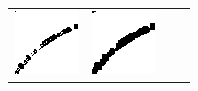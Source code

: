 \documentclass[preprint]{iucr}              %
\begin{document}
\begin{figure}
\begin{tabular}{>{\centering\arraybackslash}m{.1\linewidth}>{\centering\arraybackslash}m{.25\linewidth}>{\centering\arraybackslash}m{.25\linewidth}>{\centering\arraybackslash}m{.25\linewidth}}
\includegraphics[width=\linewidth]{Detail/NorSmooth.png}&
\includegraphics[width=\linewidth]{Detail/Dilated.png}&

\end{tabular}
\end{figure}
\end{document}
